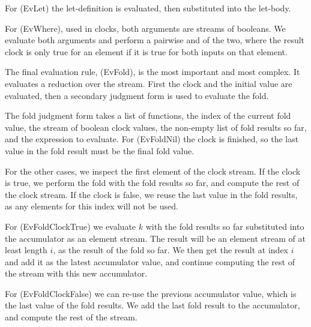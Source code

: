 For (EvLet) the let-definition is evaluated, then substituted into the let-body.

For (EvWhere), used in clocks, both arguments are streams of booleans.
We evaluate both arguments and perform a pairwise and of the two, where the result clock is only true for an element if it is true for both inputs on that element.

The final evaluation rule, (EvFold), is the most important and most complex.
It evaluates a reduction over the stream.
First the clock and the initial value are evaluated, then a secondary judgment form is used to evaluate the fold.

The fold judgment form takes a list of functions, the index of the current fold value, the stream of boolean clock values, the non-empty list of fold results so far, and the expression to evaluate.
For (EvFoldNil) the clock is finished, so the last value in the fold result must be the final fold value.

For the other cases, we inspect the first element of the clock stream.
If the clock is true, we perform the fold with the fold results so far, and compute the rest of the clock stream.
If the clock is false, we reuse the last value in the fold results, as any elements for this index will not be used.

For (EvFoldClockTrue) we evaluate $k$ with the fold results so far substituted into the accumulator as an element stream.
The result will be an element stream of at least length $i$, as the result of the fold so far.
We then get the result at index $i$ and add it as the latest accumulator value, and continue computing the rest of the stream with this new accumulator.

For (EvFoldClockFalse) we can re-use the previous accumulator value, which is the last value of the fold results.
We add the last fold result to the accumulator, and compute the rest of the stream.



